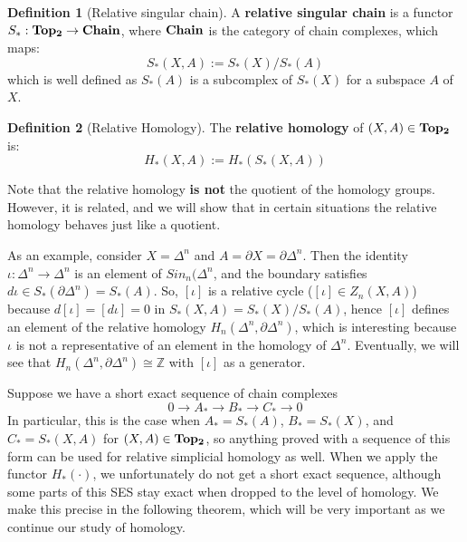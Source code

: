 \documentclass[11pt, oneside]{amsart}   	%
\theoremstyle{definition}
\newtheorem{definition}{Definition}[section]
\begin{document}
\begin{definition}[Relative singular chain]
	A \textbf{relative singular chain} is a functor $S_* : \bf{Top_2}\rightarrow\bf{Chain}$, where $\bf{Chain}$ is the 
	category of chain complexes, which maps:
	\begin{equation}
		S_*(X, A) := S_*(X) / S_*(A)
	\end{equation}
	which is well defined as $S_*(A)$ is a subcomplex of $S_*(X)$ for a subspace $A$ of $X$. 
\end{definition}

\begin{definition}[Relative Homology]
	The \textbf{relative homology} of $(X, A)\in\bf{Top_2}$ is:
	\begin{equation}
		H_*(X, A) := H_*(S_*(X, A))
	\end{equation}
\end{definition}

Note that the relative homology \textbf{is not} the quotient of the homology groups. However, it is related, and we will 
show that in certain situations the relative homology behaves just like a quotient. 

As an example, consider $X = \Delta^n$ and $A = \partial X = \partial\Delta^n$. Then the identity $\iota : 
\Delta^n\rightarrow\Delta^n$ is an element of $Sin_n(\Delta^n$, and the boundary satisfies $d\iota\in S_*(\partial\Delta^n) 
= S_*(A)$. So, $[\iota]$ is a relative cycle ($[\iota]\in Z_n(X, A)$) because $d[\iota] = [d\iota] = 0$ in $S_*(X, A) = S_*(X) / 
S_*(A)$, hence $[\iota]$ defines an element of the relative homology $H_n(\Delta^n, \partial\Delta^n)$, which is 
interesting because $\iota$ is not a representative of an element in the homology of $\Delta^n$. Eventually, we will see that 
$H_n(\Delta^n, \partial\Delta^n)\cong\mathbb Z$ with $[\iota]$ as a generator. 

Suppose we have a short exact sequence of chain complexes
\begin{equation}
	0\longrightarrow A_*\longrightarrow B_*\longrightarrow C_*\longrightarrow 0
\end{equation}
In particular, this is the case when $A_* = S_*(A)$, $B_* = S_*(X)$, and $C_* = S_*(X, A)$ for $(X, A)\in\bf{Top_2}$, so 
anything proved with a sequence of this form can be used for relative simplicial homology as well. When we apply 
the functor $H_*(\cdot)$, we unfortunately do not get a short exact sequence, although some parts of this SES stay 
exact when dropped to the level of homology. We make this precise in the following theorem, which will be very important 
as we continue our study of homology. 
\end{document}
